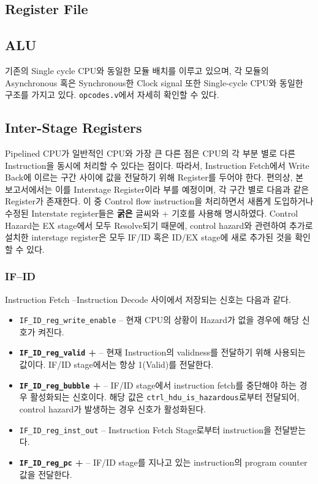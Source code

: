 \documentclass{scrartcl}
\begin{document}
\subsection{Register File}
\subsection{ALU}
기존의 Single cycle CPU와 동일한 모듈 배치를 이루고 있으며, 각 모듈의 Asynchronous 혹은 Synchronous한 Clock signal
또한 Single-cycle CPU와 동일한 구조를 가지고 있다. \texttt{opcodes.v}에서 자세히 확인할 수 있다.

\subsection{Inter-Stage Registers}
Pipelined CPU가 일반적인 CPU와 가장 큰 다른 점은 CPU의 각 부분 별로 다른 Instruction을 동시에 처리할 수 있다는 점이다.
따라서, Instruction Fetch에서 Write Back에 이르는 구간 사이에 값을 전달하기 위해 Register를 두어야 한다.
편의상, 본 보고서에서는 이를 Interstage Register이라 부를 예정이며, 각 구간 별로 다음과 같은 Register가 존재한다.
이 중 Control flow instruction을 처리하면서 새롭게 도입하거나 수정된 Interstate register들은 \textbf{굵은} 글씨와 + 기호를 사용해 명시하였다.
Control Hazard는 EX stage에서 모두 Resolve되기 때문에, control hazard와 관련하여 추가로 설치한 interstage register은 모두 IF/ID 혹은 ID/EX stage에 새로 추가된 것을 확인할 수 있다.

\subsubsection{IF--ID}
Instruction Fetch --Instruction Decode 사이에서 저장되는 신호는 다음과 같다.
\begin{itemize}
  \item \texttt{IF\_ID\_reg\_write\_enable} -- 현재 CPU의 상황이 Hazard가 없을 경우에 해당 신호가 켜진다.
  \item \textbf{\texttt{IF\_ID\_reg\_valid} +} -- 현재 Instruction의 validness를 전달하기 위해 사용되는 값이다. IF/ID stage에서는 항상 1(Valid)를 전달한다.
  \item \textbf{\texttt{IF\_ID\_reg\_bubble} +} -- IF/ID stage에서 instruction fetch를 중단해야 하는 경우 활성화되는 신호이다. 해당 값은 \texttt{ctrl\_hdu\_is\_hazardous}로부터 전달되어, control hazard가 발생하는 경우 신호가 활성화된다.
  \item \texttt{IF\_ID\_reg\_inst\_out} -- Instruction Fetch Stage로부터 instruction을 전달받는다.
  \item \textbf{\texttt{IF\_ID\_reg\_pc} +} -- IF/ID stage를 지나고 있는 instruction의 program counter 값을 전달한다.
\end{itemize}
\end{document}
